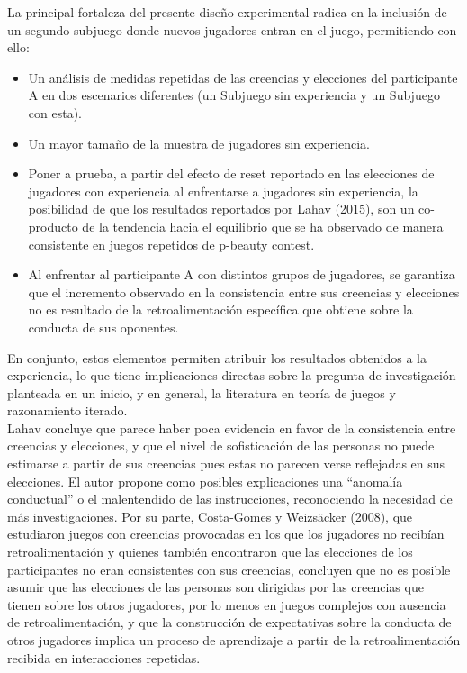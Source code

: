 La principal fortaleza del presente diseño experimental radica en la inclusión de un segundo subjuego donde nuevos jugadores entran en el juego, permitiendo con ello:\\

\begin{itemize}
\item Un análisis de medidas repetidas de las creencias y elecciones del participante A en dos escenarios diferentes (un Subjuego sin experiencia y un Subjuego con esta).\\

\item Un mayor tamaño de la muestra de jugadores sin experiencia.\\

\item Poner a prueba, a partir del efecto de reset reportado en las elecciones de jugadores con experiencia al enfrentarse a jugadores sin experiencia, la posibilidad de que los resultados reportados por Lahav (2015), son un co-producto de la tendencia hacia el equilibrio que se ha observado de manera consistente en juegos repetidos de p-beauty contest.\\

\item Al enfrentar al participante A con distintos grupos de jugadores, se garantiza que el incremento observado en la consistencia entre sus creencias y elecciones no es resultado de la retroalimentación específica que obtiene sobre la conducta de sus oponentes.\\
\end{itemize}

En conjunto, estos elementos permiten atribuir los resultados obtenidos a la experiencia, lo que tiene implicaciones directas sobre la pregunta de investigación planteada en un inicio, y en general, la literatura en teoría de juegos y razonamiento iterado.\\

Lahav \parencite*{Lahav2015} concluye que parece haber poca evidencia en favor de la consistencia entre creencias y elecciones, y que el nivel de sofisticación de las personas no puede estimarse a partir de sus creencias pues estas no parecen verse reflejadas en sus elecciones. El autor propone como posibles explicaciones una “anomalía conductual” o el malentendido de las instrucciones, reconociendo la necesidad de más investigaciones. Por su parte, Costa-Gomes y Weizsäcker (2008), que estudiaron juegos con creencias provocadas en los que los jugadores no recibían retroalimentación y quienes también encontraron que las elecciones de los participantes no eran consistentes con sus creencias, concluyen que no es posible asumir que las elecciones de las personas son dirigidas por las creencias que tienen sobre los otros jugadores, por lo menos en juegos complejos con ausencia de retroalimentación, y que la construcción de expectativas sobre la conducta de otros jugadores implica un proceso de aprendizaje a partir de la retroalimentación recibida en interacciones repetidas.\\

